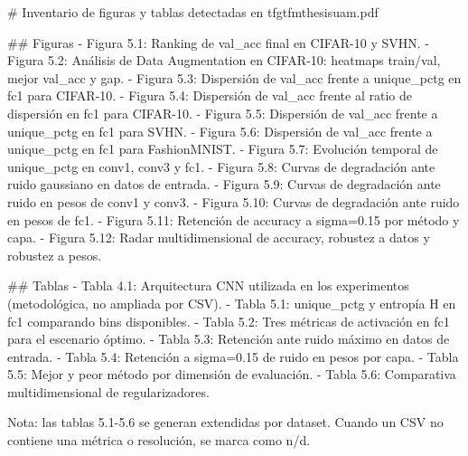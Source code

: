 # Inventario de figuras y tablas detectadas en tfgtfmthesisuam.pdf

## Figuras
- Figura 5.1: Ranking de val_acc final en CIFAR-10 y SVHN.
- Figura 5.2: Análisis de Data Augmentation en CIFAR-10: heatmaps train/val, mejor val_acc y gap.
- Figura 5.3: Dispersión de val_acc frente a unique_pctg en fc1 para CIFAR-10.
- Figura 5.4: Dispersión de val_acc frente al ratio de dispersión en fc1 para CIFAR-10.
- Figura 5.5: Dispersión de val_acc frente a unique_pctg en fc1 para SVHN.
- Figura 5.6: Dispersión de val_acc frente a unique_pctg en fc1 para FashionMNIST.
- Figura 5.7: Evolución temporal de unique_pctg en conv1, conv3 y fc1.
- Figura 5.8: Curvas de degradación ante ruido gaussiano en datos de entrada.
- Figura 5.9: Curvas de degradación ante ruido en pesos de conv1 y conv3.
- Figura 5.10: Curvas de degradación ante ruido en pesos de fc1.
- Figura 5.11: Retención de accuracy a sigma=0.15 por método y capa.
- Figura 5.12: Radar multidimensional de accuracy, robustez a datos y robustez a pesos.

## Tablas
- Tabla 4.1: Arquitectura CNN utilizada en los experimentos (metodológica, no ampliada por CSV).
- Tabla 5.1: unique_pctg y entropía H en fc1 comparando bins disponibles.
- Tabla 5.2: Tres métricas de activación en fc1 para el escenario óptimo.
- Tabla 5.3: Retención ante ruido máximo en datos de entrada.
- Tabla 5.4: Retención a sigma=0.15 de ruido en pesos por capa.
- Tabla 5.5: Mejor y peor método por dimensión de evaluación.
- Tabla 5.6: Comparativa multidimensional de regularizadores.

Nota: las tablas 5.1-5.6 se generan extendidas por dataset. Cuando un CSV no contiene una métrica o resolución, se marca como n/d.